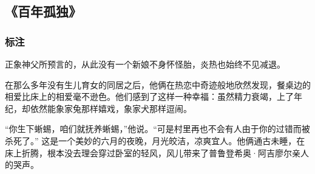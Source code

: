 \subsection{《百年孤独》}
\subsubsection{标注}
正象神父所预言的，从此没有一个新娘不身怀怪胎，炎热也始终不见减退。

在那么多年没有生儿育女的同居之后，他俩在热恋中奇迹般地欣然发现，餐桌边的相爱比床上的相爱毫不逊色。他们感到了这样一种幸福：虽然精力衰竭，上了年纪，却依然能象家兔那样嬉戏，象家犬那样逗闹。

“你生下蜥蜴，咱们就抚养蜥蜴，”他说。“可是村里再也不会有人由于你的过错而被杀死了。” 这是一个美妙的六月的夜晚，月光皎洁，凉爽宜人。他俩通古未睡，在床上折腾，根本没去理会穿过卧室的轻风，风儿带来了普鲁登希奥·阿吉廖尔亲人的哭声。